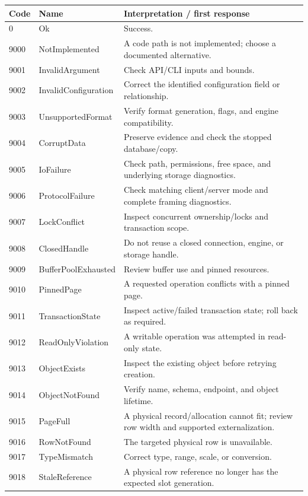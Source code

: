 \begin{longtable}{p{.1\linewidth}p{.27\linewidth}p{.52\linewidth}}
\toprule Code & Name & Interpretation / first response \\\midrule
0 & Ok & Success. \\
9000 & NotImplemented & A code path is not implemented; choose a documented alternative. \\
9001 & InvalidArgument & Check API/CLI inputs and bounds. \\
9002 & InvalidConfiguration & Correct the identified configuration field or relationship. \\
9003 & UnsupportedFormat & Verify format generation, flags, and engine compatibility. \\
9004 & CorruptData & Preserve evidence and check the stopped database/copy. \\
9005 & IoFailure & Check path, permissions, free space, and underlying storage diagnostics. \\
9006 & ProtocolFailure & Check matching client/server mode and complete framing diagnostics. \\
9007 & LockConflict & Inspect concurrent ownership/locks and transaction scope. \\
9008 & ClosedHandle & Do not reuse a closed connection, engine, or storage handle. \\
9009 & BufferPoolExhausted & Review buffer use and pinned resources. \\
9010 & PinnedPage & A requested operation conflicts with a pinned page. \\
9011 & TransactionState & Inspect active/failed transaction state; roll back as required. \\
9012 & ReadOnlyViolation & A writable operation was attempted in read-only state. \\
9013 & ObjectExists & Inspect the existing object before retrying creation. \\
9014 & ObjectNotFound & Verify name, schema, endpoint, and object lifetime. \\
9015 & PageFull & A physical record/allocation cannot fit; review row width and supported externalization. \\
9016 & RowNotFound & The targeted physical row is unavailable. \\
9017 & TypeMismatch & Correct type, range, scale, or conversion. \\
9018 & StaleReference & A physical row reference no longer has the expected slot generation. \\

\end{longtable}
